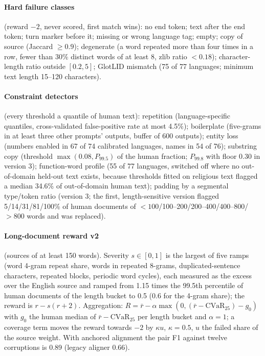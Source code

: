 \paragraph{Hard failure classes} (reward $-2$, never scored, first match wins): no end token; text after the end token; turn marker before it; missing or wrong language tag; empty; copy of source (Jaccard $\ge0.9$); degenerate (a word repeated more than four times in a row, fewer than 30\% distinct words of at least 8, zlib ratio $<0.18$); character-length ratio outside $[0.2,5]$; GlotLID mismatch (75 of 77 languages; minimum text length 15--120 characters).
\paragraph{Constraint detectors} (every threshold a quantile of human text): repetition (language-specific quantiles, cross-validated false-positive rate at most 4.5\%); boilerplate (five-grams in at least three other prompts' outputs, buffer of 600 outputs); entity loss (numbers enabled in 67 of 74 calibrated languages, names in 54 of 76); substring copy (threshold $\max(0.08,P_{99.5})$ of the human fraction; $P_{99.8}$ with floor 0.30 in version 3); function-word profile (55 of 77 languages, switched off where no out-of-domain held-out text exists, because thresholds fitted on religious text flagged a median 34.6\% of out-of-domain human text); padding by a segmental type/token ratio (version 3; the first, length-sensitive version flagged 5/14/31/81/100\% of human documents of $<100$/100--200/200--400/400--800/$>800$ words and was replaced).
\paragraph{Long-document reward v2} (sources of at least 150 words). Severity $s\in[0,1]$ is the largest of five ramps (word 4-gram repeat share, words in repeated 8-grams, duplicated-sentence characters, repeated blocks, periodic word cycles), each measured as the excess over the English source and ramped from 1.15 times the 99.5th percentile of human documents of the length bucket to 0.5 (0.6 for the 4-gram share); the reward is $r-s(r+2)$. Aggregation: $R=\bar r-\alpha\max(0,(\bar r-\mathrm{CVaR}_{25})-g_0)$ with $g_0$ the human median of $\bar r-\mathrm{CVaR}_{25}$ per length bucket and $\alpha=1$; a coverage term moves the reward towards $-2$ by $\kappa u$, $\kappa=0.5$, $u$ the failed share of the source weight. With anchored alignment the pair F1 against twelve corruptions is 0.89 (legacy aligner 0.66).

